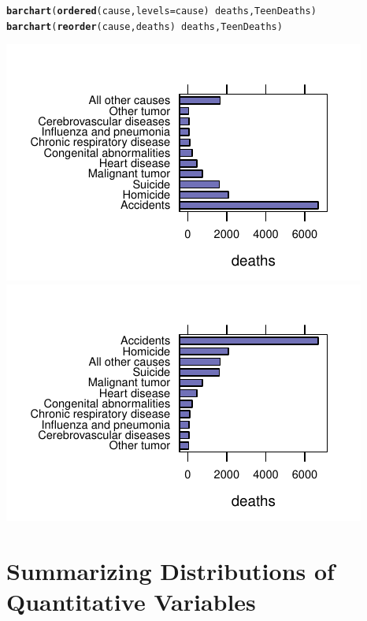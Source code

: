 \documentclass[twoside]{book}\usepackage[]{graphicx}\usepackage[]{xcolor}
\makeatletter
\def\maxwidth{ %
  \ifdim\Gin@nat@width>\linewidth
    \linewidth
  \else
    \Gin@nat@width
  \fi
}
\newcommand{\hlopt}[1]{\textcolor[rgb]{0,0,0}{#1}}%
\newcommand{\hlstd}[1]{\textcolor[rgb]{0.345,0.345,0.345}{#1}}%
\newcommand{\hlkwc}[1]{\textcolor[rgb]{0.333,0.667,0.333}{#1}}%
\newcommand{\hlkwd}[1]{\textcolor[rgb]{0.737,0.353,0.396}{\textbf{#1}}}%
\newenvironment{kframe}{%
 \def\at@end@of@kframe{}%
 \ifinner\ifhmode%
  \def\at@end@of@kframe{\end{minipage}}%
  \begin{minipage}{\columnwidth}%
 \fi\fi%
 \def\FrameCommand##1{\hskip\@totalleftmargin \hskip-\fboxsep
 \colorbox{shadecolor}{##1}\hskip-\fboxsep
     \hskip-\linewidth \hskip-\@totalleftmargin \hskip\columnwidth}%
 \MakeFramed {\advance\hsize-\width
   \@totalleftmargin\z@ \linewidth\hsize
   \@setminipage}}%
 {\par\unskip\endMakeFramed%
 \at@end@of@kframe}
\newenvironment{knitrout}{}{} %
\makeatother
\begin{document}
\begin{knitrout}
\color{fgcolor}\begin{kframe}
\begin{alltt}
\hlkwd{barchart}\hlstd{(}\hlkwd{ordered}\hlstd{(cause,} \hlkwc{levels} \hlstd{= cause)} \hlopt{~} \hlstd{deaths, TeenDeaths)}
\hlkwd{barchart}\hlstd{(}\hlkwd{reorder}\hlstd{(cause, deaths)} \hlopt{~} \hlstd{deaths, TeenDeaths)}
\end{alltt}
\end{kframe}

{\centering \includegraphics[width=\maxwidth]{figures/fig-teen-deaths-order-1} 
\includegraphics[width=\maxwidth]{figures/fig-teen-deaths-order-2} 

}



\end{knitrout}


\section{Summarizing Distributions of Quantitative Variables}
\end{document}
